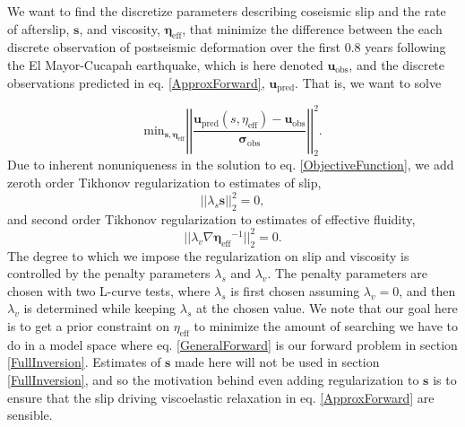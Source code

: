 \documentclass[12pt]{article}
\begin{document}
We want to find the discretize parameters describing coseismic slip and the rate of afterslip, $\mathbf{s}$, and viscosity, $\mathbf{\eta_{\mathrm{eff}}}$, that minimize the difference between the each discrete observation of postseismic deformation over the first 0.8 years following the El Mayor-Cucapah earthquake, which is here denoted $\mathbf{u_\mathrm{obs}}$, and the discrete observations predicted in eq. \ref{ApproxForward}, $\mathbf{u_\mathrm{pred}}$. That is, we want to solve

\begin{equation}\label{ObjectiveFunction}
 \mathrm{min}_{\mathbf{s},\mathbf{\eta_\mathrm{eff}}} \left|\left|
 \frac{\mathbf{u_\mathrm{pred}}(s,\eta_\mathrm{eff}) - \mathbf{u_\mathrm{obs}}}
 {\mathbf{\sigma_\mathrm{obs}}}\right|\right|_2^2.
\end{equation} 
Due to inherent nonuniqueness in the solution to eq. \ref{ObjectiveFunction}, we add zeroth order Tikhonov regularization to estimates of slip,
\begin{equation}\label{Misfit}
||\lambda_s \mathbf{s}||_2^2=0,
\end{equation}
and second order Tikhonov regularization to estimates of effective fluidity, 
\begin{equation}
||\lambda_v \nabla \mathbf{\eta_{\mathrm{eff}}}^{-1}||_2^2=0.
\end{equation}
The degree to which we impose the regularization on slip and viscosity is controlled by the penalty parameters $\lambda_s$ and $\lambda_v$.  The penalty parameters are chosen with two L-curve tests, where $\lambda_s$ is first chosen assuming $\lambda_v=0$, and then $\lambda_v$ is determined while keeping $\lambda_s$ at the chosen value.  We note that our goal here is to get a prior constraint on $\eta_{\mathrm{eff}}$ to minimize the amount of searching we have to do in a model space where eq. \ref{GeneralForward} is our forward problem in section \ref{FullInversion}.  Estimates of $\mathbf{s}$ made here will not be used in section \ref{FullInversion}, and so the motivation behind even adding regularization to $\mathbf{s}$ is to ensure that the slip driving viscoelastic relaxation in eq. \ref{ApproxForward} are sensible.  
\end{document}
